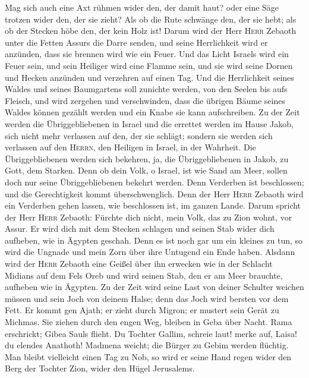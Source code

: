  Mag sich auch eine Axt rühmen wider den, der damit haut?
oder eine Säge trotzen wider den, der sie zieht? Als ob die Rute
schwänge den, der sie hebt; als ob der Stecken höbe den, der kein Holz
ist!  Darum wird der Herr \textsc{Herr} Zebaoth unter die
Fetten Assurs die Darre senden, und seine Herrlichkeit wird er anzünden,
dass sie brennen wird wie ein Feuer.  Und das Licht
Israels wird ein Feuer sein, und sein Heiliger wird eine Flamme sein,
und sie wird seine Dornen und Hecken anzünden und verzehren auf einen
Tag.  Und die Herrlichkeit seines Waldes und seines
Baumgartens soll zunichte werden, von den Seelen bis aufs Fleisch, und
wird zergehen und verschwinden,  dass die übrigen Bäume
seines Waldes können gezählt werden und ein Knabe sie kann aufschreiben.
 Zu der Zeit werden die Übriggebliebenen in Israel und
die errettet werden im Hause Jakob, sich nicht mehr verlassen auf den,
der sie schlägt; sondern sie werden sich verlassen auf den
\textsc{Herrn}, den Heiligen in Israel, in der Wahrheit. 
Die Übriggebliebenen werden sich bekehren, ja, die Übriggebliebenen in
Jakob, zu Gott, dem Starken.  Denn ob dein Volk, o
Israel, ist wie Sand am Meer, sollen doch nur seine Übriggebliebenen
bekehrt werden. Denn Verderben ist beschlossen; und die Gerechtigkeit
kommt überschwenglich.  Denn der Herr \textsc{Herr}
Zebaoth wird ein Verderben gehen lassen, wie beschlossen ist, im ganzen
Lande.  Darum spricht der Herr \textsc{Herr} Zebaoth:
Fürchte dich nicht, mein Volk, das zu Zion wohnt, vor Assur. Er wird
dich mit dem Stecken schlagen und seinen Stab wider dich aufheben, wie
in Ägypten geschah.  Denn es ist noch gar um ein kleines
zu tun, so wird die Ungnade und mein Zorn über ihre Untugend ein Ende
haben.  Alsdann wird der \textsc{Herr} Zebaoth eine
Geißel über ihn erwecken wie in der Schlacht Midians auf dem Fels Oreb
und wird seinen Stab, den er am Meer brauchte, aufheben wie in Ägypten.
 Zu der Zeit wird seine Last von deiner Schulter weichen
müssen und sein Joch von deinem Halse; denn das Joch wird bersten vor
dem Fett.  Er kommt gen Ajath; er zieht durch Migron; er
mustert sein Gerät zu Michmas.  Sie ziehen durch den
engen Weg, bleiben in Geba über Nacht. Rama erschrickt; Gibea Sauls
flieht.  Du Tochter Gallim, schreie laut! merke auf,
Laisa! du elendes Anathoth!  Madmena weicht; die Bürger
zu Gebim werden flüchtig.  Man bleibt vielleicht einen
Tag zu Nob, so wird er seine Hand regen wider den Berg der Tochter Zion,
wider den Hügel Jerusalems.

